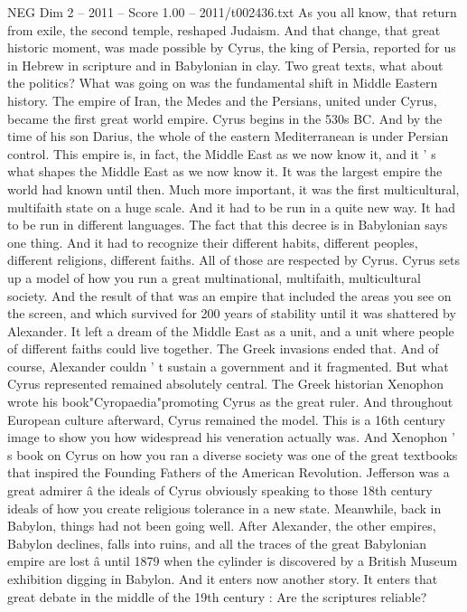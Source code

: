 \begin{textsample}{NEG Dim 2 – 2011 – Score 1.00 – 2011/t002436.txt}
As you all know, that return from exile, the second temple, reshaped Judaism.
And that change, that great historic moment, was made possible by Cyrus, the king of Persia, reported for us in Hebrew in scripture and in Babylonian in clay.
Two great texts, what about the politics?
What was going on was the fundamental shift in Middle Eastern history.
The empire of Iran, the Medes and the Persians, united under Cyrus, became the first great world empire.
Cyrus begins in the 530s BC.
And by the time of his son Darius, the whole of the eastern Mediterranean is under Persian control.
This empire is, in fact, the Middle East as we now know it, and it ' s what shapes the Middle East as we now know it.
It was the largest empire the world had known until then.
Much more important, it was the first multicultural, multifaith state on a huge scale.
And it had to be run in a quite new way.
It had to be run in different languages.
The fact that this decree is in Babylonian says one thing.
And it had to recognize their different habits, different peoples, different religions, different faiths.
All of those are respected by Cyrus.
Cyrus sets up a model of how you run a great multinational, multifaith, multicultural society.
And the result of that was an empire that included the areas you see on the screen, and which survived for 200 years of stability until it was shattered by Alexander.
It left a dream of the Middle East as a unit, and a unit where people of different faiths could live together.
The Greek invasions ended that.
And of course, Alexander couldn ' t sustain a government and it fragmented.
But what Cyrus represented remained absolutely central.
The Greek historian Xenophon wrote his book"Cyropaedia"promoting Cyrus as the great ruler.
And throughout European culture afterward, Cyrus remained the model.
This is a 16th century image to show you how widespread his veneration actually was.
And Xenophon ' s book on Cyrus on how you ran a diverse society was one of the great textbooks that inspired the Founding Fathers of the American Revolution.
Jefferson was a great admirer â the ideals of Cyrus obviously speaking to those 18th century ideals of how you create religious tolerance in a new state.
Meanwhile, back in Babylon, things had not been going well.
After Alexander, the other empires, Babylon declines, falls into ruins, and all the traces of the great Babylonian empire are lost â until 1879 when the cylinder is discovered by a British Museum exhibition digging in Babylon.
And it enters now another story.
It enters that great debate in the middle of the 19th century : Are the scriptures reliable?

\end{textsample}
